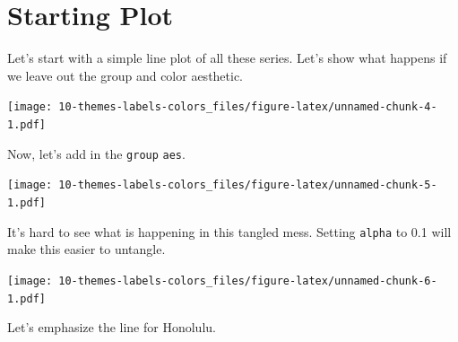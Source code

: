 \documentclass[]{book}
\newenvironment{Shaded}{\begin{snugshade}}{\end{snugshade}}
\newcommand{\KeywordTok}[1]{\textcolor[rgb]{0.13,0.29,0.53}{\textbf{{#1}}}}
\newcommand{\DataTypeTok}[1]{\textcolor[rgb]{0.13,0.29,0.53}{{#1}}}
\newcommand{\FloatTok}[1]{\textcolor[rgb]{0.00,0.00,0.81}{{#1}}}
\newcommand{\StringTok}[1]{\textcolor[rgb]{0.31,0.60,0.02}{{#1}}}
\newcommand{\NormalTok}[1]{{#1}}
\theoremstyle{definition}
\theoremstyle{definition}
\theoremstyle{remark}
\begin{document}
\section{Starting Plot}\label{starting-plot}

Let's start with a simple line plot of all these series. Let's show what
happens if we leave out the group and color aesthetic.

\begin{Shaded}
\end{Shaded}

\texttt{[image: 10-themes-labels-colors\_files/figure-latex/unnamed-chunk-4-1.pdf]}

Now, let's add in the \texttt{group} \texttt{aes}.

\begin{Shaded}
\end{Shaded}

\texttt{[image: 10-themes-labels-colors\_files/figure-latex/unnamed-chunk-5-1.pdf]}

It's hard to see what is happening in this tangled mess. Setting
\texttt{alpha} to 0.1 will make this easier to untangle.

\begin{Shaded}
\end{Shaded}

\texttt{[image: 10-themes-labels-colors\_files/figure-latex/unnamed-chunk-6-1.pdf]}

Let's emphasize the line for Honolulu.
\end{document}
